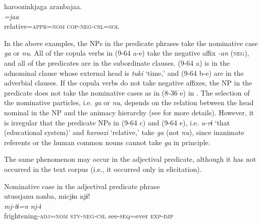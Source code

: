 \ex %
\gllll   haroozinkjaga  aranbajaa.\\
      \textit{}  \textit{=jaa}\\
      relative=\textsc{appr}=\textsc{nom}  \textsc{cop}-\textsc{neg}-\textsc{csl}=\textsc{sol}\\
      [NP  {Copula verb]\textsubscript{Nomimal predicate phrase}}\\
      \glt       ‘(They) are not relatives, so (one of them did not attend the marriage ceremony).’ [Co: 120415\_01.txt]
    \z
\z

In the above examples, the NPs in the predicate phrases take the nominative case \textit{ga} or \textit{nu}. All of the copula verbs in (9-64 a-e) take the negative affix \textit{{}-an} (\textsc{neg}), and all of the predicates are in the subordinate clauses. (9-64 a) is in the adnominal clause whose external head is \textit{tuki} ‘time,’ and (9-64 b-e) are in the adverbial clauses. If the copula verbs do not take negative affixes, the NP in the predicate does not take the nominative cases as in (8-36 e) in . The selection of the nominative particles, i.e. \textit{ga} or \textit{nu}, depends on the relation between the head nominal in the NP and the animacy hierarchy (see  for more details). However, it is irregular that the predicate NPs in (9-64 c) and (9-64 e), i.e. \textit{u-rɨ} ‘that (educational system)’ and \textit{haroozi} ‘relative,’ take \textit{ga} (not \textit{nu}), since inanimate referents or the human common nouns cannot take \textit{ga} in principle.

  The same phenomenon may occur in the adjectival predicate, although it has not occurred in the text corpus (i.e., it occurred only in elicitation).

\ea
Nominative case in the adjectival predicate phrase \label{ex:9.65}\\
 \gllll  utussjanu  nənba,  micjɨn  njɨ!\\
    \textit{}  \textit{}  \textit{mj-tɨ=n}  \textit{nj-ɨ}\\
    frightening-\textsc{adj}=\textsc{nom}  \textsc{stv}-\textsc{neg}-\textsc{csl}  see-\textsc{seq}=ever  \textsc{exp}-\textsc{imp}\\
    [Adjective  {Stative verb]\textsubscript{Adjectival predicate phrase}}    \\
    \glt     ‘(It) is not frightening, so try to see (it)!’ [El: 130822]
\z

